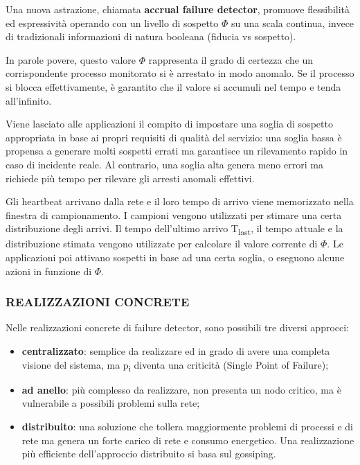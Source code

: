 Una nuova astrazione, chiamata \textbf{accrual failure detector}, promuove flessibilità ed espressività operando con un livello di sospetto $\Phi$ su una scala continua, invece di tradizionali informazioni di natura booleana (fiducia vs sospetto).

In parole povere, questo valore $\Phi$ rappresenta il grado di certezza che un corrispondente processo monitorato si è arrestato in modo anomalo. Se il processo si blocca effettivamente, è garantito che il valore si accumuli nel tempo e tenda all'infinito.

Viene lasciato alle applicazioni il compito di impostare una soglia di sospetto appropriata in base ai propri requisiti di qualità del servizio: una soglia bassa è propensa a generare molti sospetti errati ma garantisce un rilevamento rapido in caso di incidente reale. Al contrario, una soglia alta genera meno errori ma richiede più tempo per rilevare gli arresti anomali effettivi.

Gli heartbeat arrivano dalla rete e il loro tempo di arrivo viene memorizzato nella finestra di campionamento. I campioni vengono utilizzati per stimare una certa distribuzione degli arrivi. Il tempo dell'ultimo arrivo T\textsubscript{last}, il tempo attuale e la distribuzione stimata vengono utilizzate per calcolare il valore corrente di $\Phi$. Le applicazioni poi attivano sospetti in base ad una certa soglia, o eseguono alcune azioni in funzione di $\Phi$.

\subsubsection{REALIZZAZIONI CONCRETE}
Nelle realizzazioni concrete di failure detector, sono possibili tre diversi approcci:
\begin{itemize}
    \item \textbf{centralizzato}: semplice da realizzare ed in grado di avere una completa visione del sistema, ma p\textsubscript{i} diventa una criticità (Single Point of Failure);
    \item \textbf{ad anello}: più complesso da realizzare, non presenta un nodo critico, ma è vulnerabile a possibili problemi sulla rete;
    \item \textbf{distribuito}: una soluzione che tollera maggiormente problemi di processi e di rete ma genera un forte carico di rete e consumo energetico. Una realizzazione più efficiente dell'approccio distribuito si basa sul gossiping.
\end{itemize}


